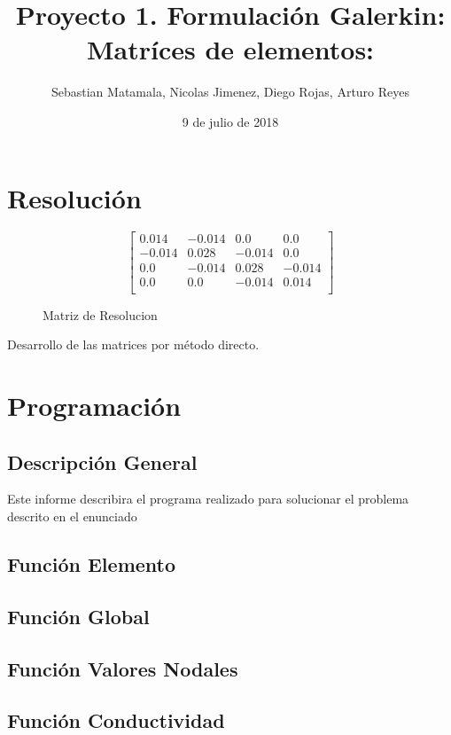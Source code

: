 \documentclass{article}
\title{Proyecto 1. Formulación Galerkin: Matríces de elementos: }
\author{Sebastian Matamala, Nicolas Jimenez, Diego Rojas, Arturo Reyes}
\date{9 de julio de 2018}
\begin{document}
\maketitle

\section{Resolución}

\begin{figure}[!ht]
    \centering
    \[
    \begin{bmatrix}
        {0.014} & {-0.014} & {0.0} & {0.0}\\
        {-0.014} & {0.028} & {-0.014} & {0.0}\\
        {0.0} & {-0.014} & {0.028} & {-0.014}\\
        {0.0} & {0.0} & {-0.014} & {0.014}\\
    \end{bmatrix}
    \]
    \caption{Matriz de Resolucion}
\end{figure}
Desarrollo de las matrices por método directo.

\section{Programación}

\subsection{Descripción General}
Este informe describira el programa realizado para solucionar el problema descrito en el enunciado
\subsection{Función Elemento}
\subsection{Función Global}
\subsection{Función Valores Nodales}
\subsection{Función Conductividad}
\end{document}
